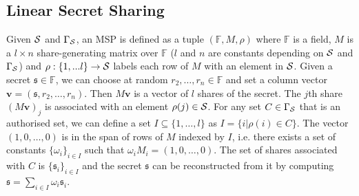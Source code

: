 \subsection{Linear Secret Sharing}
Given $\mathcal{S}$ and $\Gamma_\mathcal{S}$, an \ac{MSP} is defined as a tuple $(\mathbb{F},M,\rho)$ where $\mathbb{F}$ is a field, $M$ is a $l\times n$ share-generating matrix over $\mathbb{F}$ ($l$ and $n$ are constants depending on  $\mathcal{S}$ and $\Gamma_\mathcal{S}$) and $\rho:\{1,...l\}\rightarrow \mathcal{S}$ labels each row of $M$ with an element in $\mathcal{S}$. 
Given a secret $\mathfrak{s}\in \mathbb{F}$, we can choose at random $r_2,\ldots,r_n \in \mathbb{F}$ and set a column vector $\mathbf{v}=(\mathfrak{s},r_2,\ldots,r_n)$. 
Then $M\mathbf{v}$ is a vector of $l$ shares of the secret. 
The $j$th share $(M\mathbf{v})_{j}$ is associated with an element $\rho(j) \in \mathcal{S}$. 
For any set $C\in \Gamma_\mathcal{S}$ that is an authorised set, we can define a set $I\subseteq \{1,\ldots,l\}$ as $I=\{i|\rho(i)\in C\}$. 
The vector $(1,0,\ldots,0)$ is in the span of rows of $M$ indexed by $I$, i.e. there exists a set of constants $\{\omega_i\}_{i\in I}$ such that $\omega_iM_i=(1,0,\ldots,0)$. 
The set of shares associated with $C$ is $\{\mathfrak{s}_i\}_{i\in I}$ and the secret $\mathfrak{s}$ can be reconstructed from it by computing $\mathfrak{s}=\sum_{i\in I}\omega_i\mathfrak{s}_i$.



